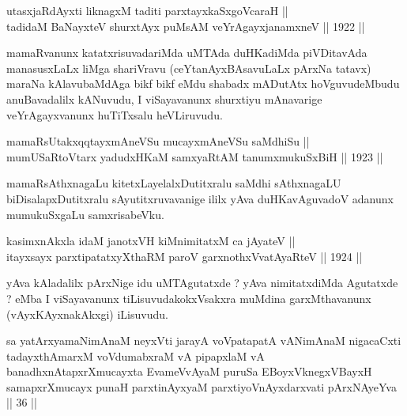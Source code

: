 \begin{shl}
utasxjaRdAyxti liknagxM taditi parxtayxkaSxgoVcaraH ||  \\
tadidaM BaNayxteV shurxtAyx puMsAM veYrAgayxjanamxneV \hfill || 1922 ||
  
\end{shl}

\begin{artha}
mamaRvanunx katatxrisuvadariMda uMTAda duHKadiMda piVDitavAda
manasusxLaLx liMga shariVravu (ceYtanAyxBAsavuLaLx pArxNa tatavx)
maraNa kAlavubaMdAga bikf bikf eMdu shabadx mADutAtx hoVguvudeMbudu
anuBavadalilx kANuvudu, I viSayavanunx shurxtiyu mAnavarige
veYrAgayxvanunx huTiTxsalu heVLiruvudu.
\end{artha}

\begin{shl}
mamaRsUtakxqqtayxmAneVSu mucayxmAneVSu saMdhiSu || \\
mumUSaRtoV\s tarx yadudxHKaM samxyaRtAM tanumxmukuSxBiH \hfill || 1923 ||
  
\end{shl}

\begin{artha}
mamaRsAthxnagaLu kitetxLayelalxDutitxralu saMdhi sAthxnagaLU
biDisalapxDutitxralu sAyutitxruvavanige ililx yAva duHKavAguvadoV
adanunx mumukuSxgaLu samxrisabeVku.
\end{artha}

\begin{shl}
kasimxnAkxla idaM janotxVH kiMnimitatxM ca jAyateV ||  \\
itayxsayx parxtipatatxyXthaRM paroV garxnothxV\s vatAyaRteV \hfill || 1924 ||
  
\end{shl}

\begin{artha}
yAva kAladalilx pArxNige idu uMTAgutatxde ? yAva nimitatxdiMda
Agutatxde ? eMba I viSayavanunx tiLisuvudakokxVsakxra muMdina
garxMthavanunx (vAyxKAyxnakAkxgi) iLisuvudu.
\end{artha}


\begin{shl}
sa yatArxyamaNimAnaM neyxVti jarayA voVpatapatA vANimAnaM nigacaCxti tadayxthAmarxM voVdumabxraM vA pipapxlaM vA banadhxnAtapxrXmucayxta EvameVvAyaM puruSa EBoyxV\s knegxVBayxH samapxrXmucayx punaH parxtinAyxyaM parxtiyoVnAyxdarxvati pArxNAyeYva || 36 ||
\end{shl}


